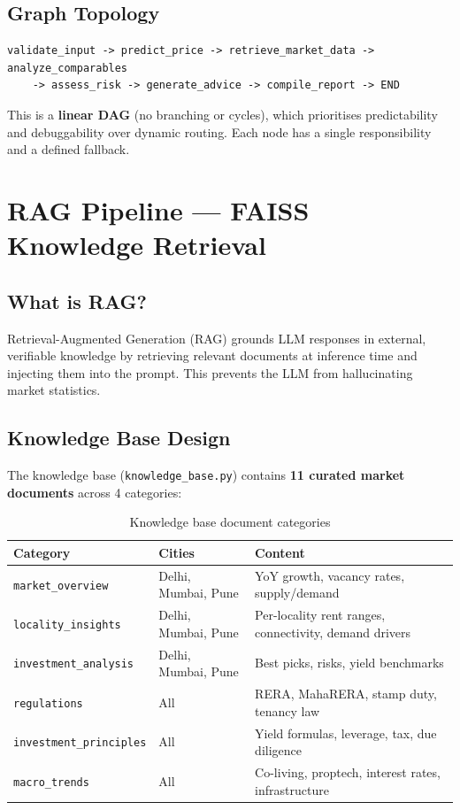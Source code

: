 \documentclass[12pt,a4paper]{article}
\newcommand{\code}[1]{\texttt{\small #1}}
\begin{document}
\subsection{Graph Topology}

\begin{lstlisting}[language={}, caption={Linear DAG pipeline topology}]
validate_input -> predict_price -> retrieve_market_data -> analyze_comparables
    -> assess_risk -> generate_advice -> compile_report -> END
\end{lstlisting}

This is a \textbf{linear DAG} (no branching or cycles), which prioritises predictability and debuggability over dynamic routing. Each node has a single responsibility and a defined fallback.

\section{RAG Pipeline --- FAISS Knowledge Retrieval}

\subsection{What is RAG?}

Retrieval-Augmented Generation (RAG) grounds LLM responses in external, verifiable knowledge by retrieving relevant documents at inference time and injecting them into the prompt. This prevents the LLM from hallucinating market statistics.

\subsection{Knowledge Base Design}

The knowledge base (\code{knowledge\_base.py}) contains \textbf{11 curated market documents} across 4 categories:

\begin{table}[H]
\centering
\caption{Knowledge base document categories}
\begin{tabular}{lll}
\toprule
\textbf{Category} & \textbf{Cities} & \textbf{Content} \\
\midrule
\code{market\_overview}       & Delhi, Mumbai, Pune & YoY growth, vacancy rates, supply/demand \\
\code{locality\_insights}     & Delhi, Mumbai, Pune & Per-locality rent ranges, connectivity, demand drivers \\
\code{investment\_analysis}   & Delhi, Mumbai, Pune & Best picks, risks, yield benchmarks \\
\code{regulations}            & All  & RERA, MahaRERA, stamp duty, tenancy law \\
\code{investment\_principles} & All  & Yield formulas, leverage, tax, due diligence \\
\code{macro\_trends}          & All  & Co-living, proptech, interest rates, infrastructure \\
\bottomrule
\end{tabular}
\end{table}
\end{document}
